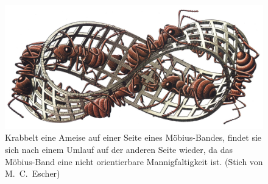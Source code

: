 %
%
%
\begin{figure}
\centering
\includegraphics[width=\textwidth]{chapters/040-green/images/ants.jpg}
\caption{Krabbelt eine Ameise auf einer Seite eines Möbius-Bandes,
findet sie sich nach einem Umlauf auf der anderen Seite wieder, da
das Möbius-Band eine nicht orientierbare Mannigfaltigkeit ist.
(Stich von M.~C.~Escher)
\label{buch:green:fig:ants}}
\end{figure}
